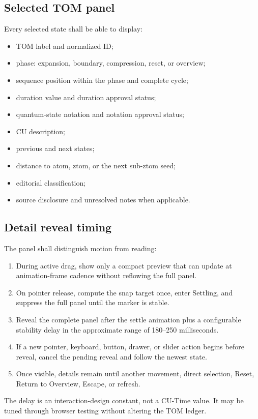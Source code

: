 \documentclass[11pt,letterpaper]{article}
\begin{document}
\subsection{Selected TOM panel}
Every selected state shall be able to display:
\begin{itemize}
\item TOM label and normalized ID;
\item phase: expansion, boundary, compression, reset, or overview;
\item sequence position within the phase and complete cycle;
\item duration value and duration approval status;
\item quantum-state notation and notation approval status;
\item CU description;
\item previous and next states;
\item distance to atom, ztom, or the next sub-ztom seed;
\item editorial classification;
\item source disclosure and unresolved notes when applicable.
\end{itemize}

\subsection{Detail reveal timing}
The panel shall distinguish motion from reading:
\begin{enumerate}
\item During active drag, show only a compact preview that can update at animation-frame cadence without reflowing the full panel.
\item On pointer release, compute the snap target once, enter Settling, and suppress the full panel until the marker is stable.
\item Reveal the complete panel after the settle animation plus a configurable stability delay in the approximate range of 180--250 milliseconds.
\item If a new pointer, keyboard, button, drawer, or slider action begins before reveal, cancel the pending reveal and follow the newest state.
\item Once visible, details remain until another movement, direct selection, Reset, Return to Overview, Escape, or refresh.
\end{enumerate}
The delay is an interaction-design constant, not a CU-Time value. It may be tuned through browser testing without altering the TOM ledger.
\end{document}
